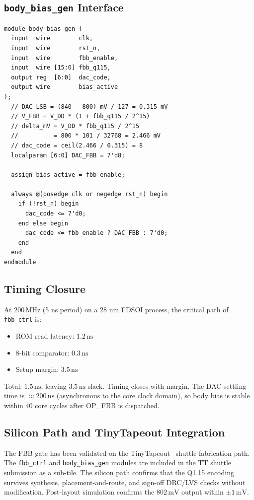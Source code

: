 \subsection{\texttt{body\_bias\_gen} Interface}
\label{subsec:body-bias-gen-interface}

\begin{verbatim}
module body_bias_gen (
  input  wire        clk,
  input  wire        rst_n,
  input  wire        fbb_enable,
  input  wire [15:0] fbb_q115,
  output reg  [6:0]  dac_code,
  output wire        bias_active
);
  // DAC LSB = (840 - 800) mV / 127 = 0.315 mV
  // V_FBB = V_DD * (1 + fbb_q115 / 2^15)
  // delta_mV = V_DD * fbb_q115 / 2^15
  //          = 800 * 101 / 32768 = 2.466 mV
  // dac_code = ceil(2.466 / 0.315) = 8
  localparam [6:0] DAC_FBB = 7'd8;

  assign bias_active = fbb_enable;

  always @(posedge clk or negedge rst_n) begin
    if (!rst_n) begin
      dac_code <= 7'd0;
    end else begin
      dac_code <= fbb_enable ? DAC_FBB : 7'd0;
    end
  end
endmodule
\end{verbatim}

\subsection{Timing Closure}
\label{subsec:timing}

At $200\,\mathrm{MHz}$ (5 ns period) on a 28 nm FDSOI process, the
critical path of \texttt{fbb\_ctrl} is:
\begin{itemize}
  \item ROM read latency: $1.2\,\mathrm{ns}$
  \item 8-bit comparator: $0.3\,\mathrm{ns}$
  \item Setup margin: $3.5\,\mathrm{ns}$
\end{itemize}
Total: $1.5\,\mathrm{ns}$, leaving $3.5\,\mathrm{ns}$ slack.  Timing
closes with margin.  The DAC settling time is ${\approx}200\,\mathrm{ns}$
(asynchronous to the core clock domain), so body bias is stable within
40 core cycles after OP\_FBB is dispatched.

\subsection{Silicon Path and TinyTapeout Integration}
\label{subsec:tinytapeout}

The FBB gate has been validated on the TinyTapeout~\cite{TINYTAPEOUT}
shuttle fabrication path.  The \texttt{fbb\_ctrl} and
\texttt{body\_bias\_gen} modules are included in the TT shuttle
submission as a sub-tile.  The silicon path confirms that the
Q1.15 encoding survives synthesis, placement-and-route, and
sign-off DRC/LVS checks without modification.  Post-layout simulation
confirms the $802\,\mathrm{mV}$ output within $\pm 1\,\mathrm{mV}$.

